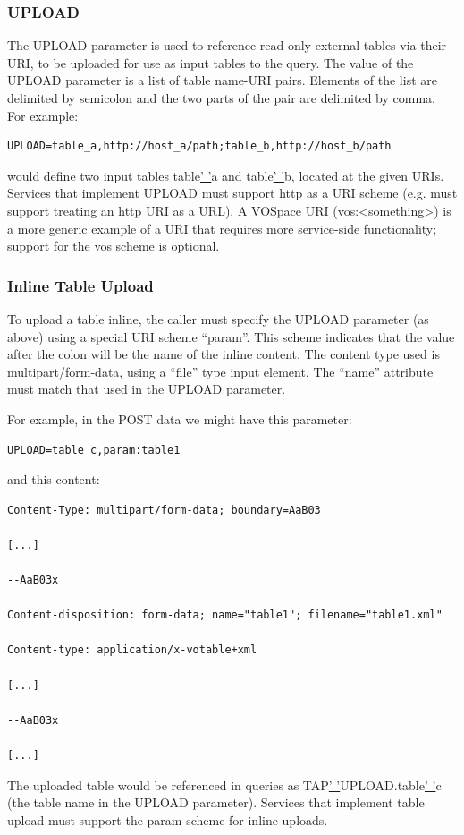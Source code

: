 \documentclass[11pt,a4paper]{ivoa}
\begin{document}
\subsubsection{UPLOAD}
The UPLOAD parameter is used to reference read-only external tables via their 
URI, to be uploaded for use as input tables to the query.   The value of the 
UPLOAD parameter is a list of table name-URI pairs. Elements of the list are  
delimited by semicolon and the two parts of the pair are delimited by comma. For 
example:
\begin{verbatim}
UPLOAD=table_a,http://host_a/path;table_b,http://host_b/path
\end{verbatim}

would define two input tables table\underline{' '}a and 
table\underline{' '}b, located at the given URIs. Services that implement 
UPLOAD must support http as a URI scheme (e.g. must support treating an http URI 
as a URL). A VOSpace URI (vos:<something>)  is a more generic example of a URI 
that requires more service-side functionality; support for the vos scheme is 
optional.

\subsubsection{Inline Table Upload}
To upload a table inline, the caller must specify the UPLOAD parameter (as 
above) using a special URI scheme “param”. This scheme indicates that the value 
after the colon will be the name of the inline content. The content type used is 
multipart/form-data, using a “file” type input element. The “name” attribute 
must match that used in the UPLOAD parameter.

For example, in the POST data we might have this parameter:
\begin{verbatim}
UPLOAD=table_c,param:table1
\end{verbatim}
and this content:
\begin{verbatim}
Content-Type: multipart/form-data; boundary=AaB03

[...]

--AaB03x

Content-disposition: form-data; name="table1"; filename="table1.xml"

Content-type: application/x-votable+xml

[...]

--AaB03x

[...]
\end{verbatim}
The uploaded table would be referenced in queries as 
TAP\underline{' '}UPLOAD.table\underline{' '}c (the table name in the UPLOAD 
parameter). Services that implement table upload must support the param scheme 
for inline uploads.
\end{document}
